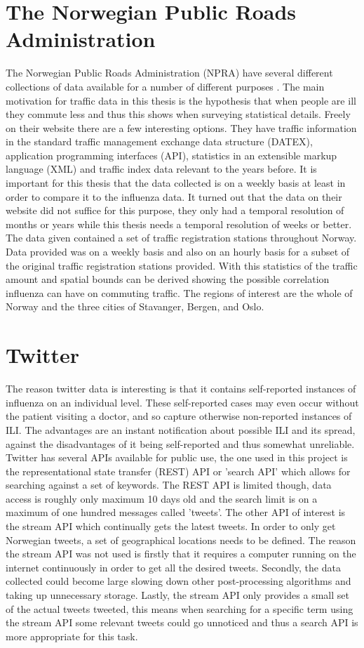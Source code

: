 \section{The Norwegian Public Roads Administration}
The Norwegian Public Roads Administration (NPRA) have several different collections of data available for a number of different purposes \cite{vegvesenet}. The main motivation for traffic data in this thesis is the hypothesis that when people are ill they commute less and thus this shows when surveying statistical details. Freely on their website \cite{vegvesenet} there are a few interesting options. They have traffic information in the standard traffic management exchange data structure (DATEX), application programming interfaces (API), statistics in an extensible markup language (XML) and traffic index data relevant to the years before. It is important for this thesis that the data collected is on a weekly basis at least in order to compare it to the influenza data. It turned out that the data on their website did not suffice for this purpose, they only had a temporal resolution of months or years while this thesis needs a temporal resolution of weeks or better. The data given contained a set of traffic registration stations throughout Norway. Data provided was on a weekly basis and also on an hourly basis for a subset of the original traffic registration stations provided. With this statistics of the traffic amount and spatial bounds can be derived showing the possible correlation influenza can have on commuting traffic. The regions of interest are the whole of Norway and the three cities of Stavanger, Bergen, and Oslo.

\section{Twitter}
The reason twitter data is interesting is that it contains self-reported instances of influenza on an individual level. These self-reported cases may even occur without the patient visiting a doctor, and so capture otherwise non-reported instances of ILI. The advantages are an instant notification about possible ILI and its spread, against the disadvantages of it being self-reported and thus somewhat unreliable. Twitter has several APIs available for public use, the one used in this project is the representational state transfer (REST) API or 'search API' which allows for searching against a set of keywords. The REST API is limited though, data access is roughly only maximum 10 days old and the search limit is on a maximum of one hundred messages called 'tweets'. The other API of interest is the stream API which continually gets the latest tweets. In order to only get Norwegian tweets, a set of geographical locations needs to be defined. The reason the stream API was not used is firstly that it requires a computer running on the internet continuously in order to get all the desired tweets. Secondly, the data collected could become large slowing down other post-processing algorithms and taking up unnecessary storage. Lastly, the stream API only provides a small set of the actual tweets tweeted, this means when searching for a specific term using the stream API some relevant tweets could go unnoticed and thus a search API is more appropriate for this task.

